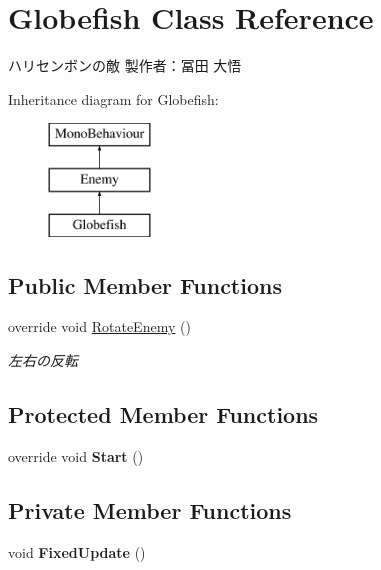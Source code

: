 \hypertarget{class_globefish}{}\section{Globefish Class Reference}
\label{class_globefish}


ハリセンボンの敵 製作者：冨田 大悟  


Inheritance diagram for Globefish\+:\begin{figure}[H]
\begin{center}
\leavevmode
\includegraphics[height=3.000000cm]{class_globefish}
\end{center}
\end{figure}
\subsection*{Public Member Functions}
\begin{DoxyCompactItemize}
\item 
override void \hyperlink{class_globefish_a31c4458c5be4f3739e1ceedd69656185}{Rotate\+Enemy} ()
\begin{DoxyCompactList}\small\item\em 左右の反転 \end{DoxyCompactList}\end{DoxyCompactItemize}
\subsection*{Protected Member Functions}
\begin{DoxyCompactItemize}
\item 
\mbox{\label{class_globefish_a5b3ed48da50f6dead507a6fe614b038e}} 
override void {\bfseries Start} ()
\end{DoxyCompactItemize}
\subsection*{Private Member Functions}
\begin{DoxyCompactItemize}
\item 
\mbox{\label{class_globefish_a3af0526c1304372567f2d6c18a11f341}} 
void {\bfseries Fixed\+Update} ()
\end{DoxyCompactItemize}
